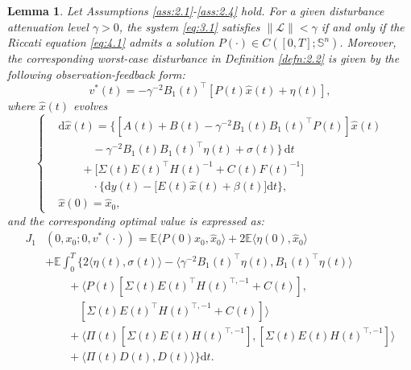 \documentclass[10pt,a4paper]{amsart}
\newtheorem{lem}{Lemma}
\begin{document}
\begin{lem}\label{lem:4.3}
	Let Assumptions \ref{ass:2.1}-\ref{ass:2.4} hold. For a given disturbance attenuation level $\gamma > 0$, the system \eqref{eq:3.1} satisfies $\|\mathcal{L}\| < \gamma$ if and only if the Riccati equation \eqref{eq:4.1} admits a solution $P(\cdot) \in C([0,T];\mathbb{S}^n)$. Moreover, the corresponding worst-case disturbance in Definition \ref{defn:2.2} is given by the following observation-feedback form:
	\begin{equation}\label{eq:4.5}
		v^*(t) = -\gamma^{-2}B_1(t)^{\top}[P(t)\widehat{x}(t) + \eta(t)],
	\end{equation}
	where $\widehat{x}(t)$ evolves
	\begin{equation*}
		\left\{
		\begin{aligned}
			&\mathrm{d}\widehat{x}(t) = \Big\{[A(t) + B(t) - \gamma^{-2}B_1(t)B_1(t)^{\top}P(t)]\widehat{x}(t) \\
			&\qquad \quad- \gamma^{-2}B_1(t)B_1(t)^{\top}\eta(t) + \sigma(t)\Big\}\,\mathrm{d}t \\
			&\qquad + \Big[\Sigma(t)E(t)^{\top}H(t)^{-1} + C(t)F(t)^{-1}\Big] \\
			&\qquad \quad\cdot \Big\{\mathrm{d}y(t) - \Big[E(t)\widehat{x}(t) + \beta(t)\Big]\mathrm{d}t\Big\},\\
			&\widehat{x}(0) = \widehat{x}_0,
		\end{aligned}
		\right.
	\end{equation*}
	and the corresponding optimal value is expressed as:
	\begin{equation}\label{eq:4.6}
		\begin{aligned}
			J_1&(0,x_0;0,v^*(\cdot)) = \mathbb{E} \langle P(0)\widehat{x}_0,\widehat{x}_0 \rangle + 2\mathbb{E}\langle \eta(0),\widehat{x}_0 \rangle\\
			&+ \mathbb{E}\int_0^T \Big\{ 2\langle \eta(t),\sigma(t) \rangle - \langle \gamma^{-2} B_1(t)^\top \eta(t),B_1(t)^\top \eta(t) \rangle\\
			&\qquad + \langle P(t)[\Sigma(t) E(t)^\top H(t)^{\top,-1} + C(t)],\\
			&\qquad \quad [\Sigma(t)E(t)^\top H(t)^{\top,-1} + C(t)] \rangle\\
			&\qquad +\langle\Pi(t)[\Sigma(t)E(t)H(t)^{\top,-1}],[\Sigma(t)E(t)H(t)^{\top,-1}]\rangle \\
			&\qquad + \langle\Pi(t)D(t),D(t)\rangle \Big\} \mathrm{d}t.
		\end{aligned}
	\end{equation}
\end{lem}
\end{document}
